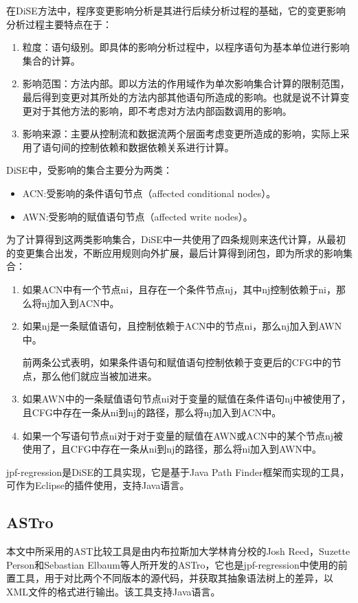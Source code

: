 在DiSE方法中，程序变更影响分析是其进行后续分析过程的基础，它的变更影响分析过程主要特点在于：
\begin{enumerate}
	\item 粒度：语句级别。即具体的影响分析过程中，以程序语句为基本单位进行影响集合的计算。
	\item 影响范围：方法内部。即以方法的作用域作为单次影响集合计算的限制范围，最后得到变更对其所处的方法内部其他语句所造成的影响。也就是说不计算变更对于其他方法的影响，即不考虑对方法内部函数调用的影响。
	\item 影响来源：主要从控制流和数据流两个层面考虑变更所造成的影响，实际上采用了语句间的控制依赖和数据依赖关系进行计算。
\end{enumerate}

DiSE中，受影响的集合主要分为两类：
\begin{itemize}
	\item ACN:受影响的条件语句节点（affected conditional nodes）。
	\item AWN:受影响的赋值语句节点（affected write nodes）。
\end{itemize}

为了计算得到这两类影响集合，DiSE中一共使用了四条规则来迭代计算，从最初的变更集合出发，不断应用规则向外扩展，最后计算得到闭包，即为所求的影响集合：
\begin{enumerate}
	\item 如果ACN中有一个节点ni，且存在一个条件节点nj，其中nj控制依赖于ni，那么将nj加入到ACN中。
	\item 如果nj是一条赋值语句，且控制依赖于ACN中的节点ni，那么nj加入到AWN中。
	     
	前两条公式表明，如果条件语句和赋值语句控制依赖于变更后的CFG中的节点，那么他们就应当被加进来。
	     
	\item 如果AWN中的一条赋值语句节点ni对于变量的赋值在条件语句nj中被使用了，且CFG中存在一条从ni到nj的路径，那么将nj加入到ACN中。

	\item 如果一个写语句节点ni对于对于变量的赋值在AWN或ACN中的某个节点nj被使用了，且CFG中存在一条从ni到nj的路径，那么将ni加入到AWN中。

\end{enumerate}

jpf-regression是DiSE的工具实现，它是基于Java Path Finder框架而实现的工具，可作为Eclipse的插件使用，支持Java语言。

\subsection{ASTro}	

	本文中所采用的AST比较工具是由内布拉斯加大学林肯分校的Josh Reed，Suzette Person和Sebastian Elbaum等人所开发的ASTro，它也是jpf-regression中使用的前置工具，用于对比两个不同版本的源代码，并获取其抽象语法树上的差异，以XML文件的格式进行输出。该工具支持Java语言。
	